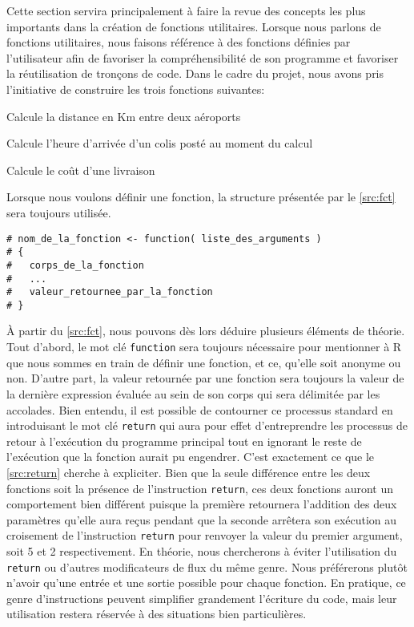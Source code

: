 Cette section servira principalement à faire la revue des concepts les plus importants dans la création de fonctions utilitaires. Lorsque nous parlons de fonctions utilitaires, nous faisons référence à des fonctions définies par l'utilisateur afin de favoriser la compréhensibilité de son programme et favoriser la réutilisation de tronçons de code. Dans le cadre du projet, nous avons pris l'initiative de construire les trois fonctions suivantes: \\
\begin{description}[style=multiline,leftmargin=2.5cm]
	\item[airportsDist] Calcule la distance en Km entre deux aéroports
	\item[arrivalTime] Calcule l'heure d'arrivée d'un colis posté au moment du calcul
	\item[shippingCost] Calcule le coût d'une livraison
\end{description}

Lorsque nous voulons définir une fonction, la structure présentée par le \autoref{src:fct} sera toujours utilisée. 

\begin{lstlisting}[caption = Structure pour la définition d'une fonction,label=src:fct]
# nom_de_la_fonction <- function( liste_des_arguments )
# {
# 	corps_de_la_fonction
# 	... 
# 	valeur_retournee_par_la_fonction
# }
\end{lstlisting}

\vspace{\baselineskip}
À partir du \autoref{src:fct}, nous pouvons dès lors déduire plusieurs éléments de théorie. Tout d'abord, le mot clé \texttt{function} sera toujours nécessaire pour mentionner à R que nous sommes en train de définir une fonction, et ce, qu'elle soit anonyme ou non. D'autre part, la valeur retournée par une fonction sera toujours la valeur de la dernière expression évaluée au sein de son corps qui sera délimitée par les accolades. Bien entendu, il est possible de contourner ce processus standard en introduisant le mot clé \texttt{return} qui aura pour effet d'entreprendre les processus de retour à l'exécution du programme principal tout en ignorant le reste de l'exécution que la fonction aurait pu engendrer. C'est exactement ce que le \autoref{src:return} cherche à expliciter. Bien que la seule différence entre les deux fonctions soit la présence de l'instruction \texttt{return}, ces deux fonctions auront un comportement bien différent puisque la première retournera l'addition des deux paramètres qu'elle aura reçus pendant que la seconde arrêtera son exécution au croisement de l'instruction \texttt{return} pour renvoyer la valeur du premier argument, soit 5 et 2 respectivement. En théorie, nous chercherons à éviter l'utilisation du \texttt{return} ou d'autres modificateurs de flux du même genre. Nous préférerons plutôt n'avoir qu'une entrée et une sortie possible pour chaque fonction. En pratique, ce genre d'instructions peuvent simplifier grandement l'écriture du code, mais leur utilisation restera réservée à des situations bien particulières.

